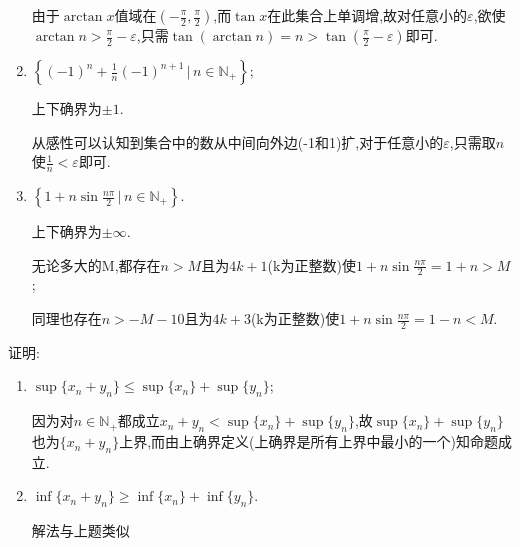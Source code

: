 \documentclass[cn,chinese,fontset]{elegantbook}
\begin{document}
\begin{exercise}
\begin{enumerate}
\begin{solution}
                        由于$\arctan x$值域在$\left(-\frac{\pi}{2},\frac{\pi}{2}\right)$,而$\tan x$在此集合上单调增,故对任意小的$\varepsilon$,欲使$\arctan n>\frac{\pi}{2}-\varepsilon$,只需$\tan(\arctan n)=n>\tan\left(\frac{\pi}{2}-\varepsilon\right)$即可.

                    \end{solution}\item $\left\{(-1)^n+\frac{1}{n}(-1)^{n+1}\,\biggl\lvert\, n\in \mathbb{N}_+\right\};$
                    \begin{solution}
                        上下确界为$\pm 1$.

                        从感性可以认知到集合中的数从中间向外边(-1和1)扩,对于任意小的$\varepsilon$,只需取$n$使$\frac{1}{n}<\varepsilon$即可.
                    \end{solution}\item $\left\{1+n\sin\frac{n\pi}{2}\,\bigg\lvert\, n\in \mathbb{N}_+\right\}$.
                    \begin{solution}
                        上下确界为$\pm \infty$.

                        无论多大的M,都存在$n>M$且为$4k+1$(k为正整数)使$1+n\sin\frac{n\pi}{2}=1+n>M$;

                        同理也存在$n>-M-10$且为$4k+3$(k为正整数)使$1+n\sin\frac{n\pi}{2}=1-n<M$.
                    \end{solution}
          \end{enumerate}
      \end{exercise}

      \begin{exercise}
          证明:
          \begin{enumerate}
              \item $\sup\{x_n+y_n\}\leqslant \sup\{x_n\}+\sup\{y_n\}$;
                    \begin{solution}
                        因为对$n\in \mathbb{N}_+$都成立$x_n+y_n<\sup\{x_n\}+\sup\{y_n\}$,故$\sup\{x_n\}+\sup\{y_n\}$也为$\{x_n+y_n\}$上界,而由上确界定义(上确界是所有上界中最小的一个)知命题成立.
                    \end{solution}\item $\inf\{x_n+y_n\}\geqslant\inf\{x_n\}+\inf\{y_n\}$.
                    \begin{solution}
                        解法与上题类似
                    \end{solution}
          \end{enumerate}
      \end{exercise}
\end{document}
